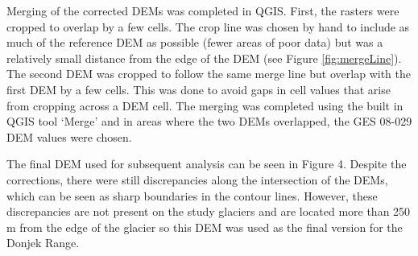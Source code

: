 \documentclass[12pt]{article}
\begin{document}
Merging of the corrected DEMs was completed in QGIS. First, the rasters were cropped to overlap by a few cells. The crop line was chosen by hand to include as much of the reference DEM as possible (fewer areas of poor data) but was a relatively small distance from the edge of the DEM (see Figure \ref{fig:mergeLine}). The second DEM was cropped to follow the same merge line but overlap with the first DEM by a few cells. This was done to avoid gaps in cell values that arise from cropping across a DEM cell. The merging was completed using the built in QGIS tool `Merge' and in areas where the two DEMs overlapped, the GES 08-029 DEM values were chosen.

The final DEM used for subsequent analysis can be seen in Figure 4. Despite the corrections, there were still discrepancies along the intersection of the DEMs, which can be seen as sharp boundaries in the contour lines. However, these discrepancies are not present on the study glaciers and are located more than 250 m from the edge of the glacier so this DEM was used as the final version for the Donjek Range.

\begin{figure}
  \label{fig:finalDEM}
\end{figure}
\end{document}
